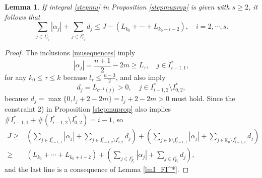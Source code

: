 \documentclass[11pt,reqno]{amsart}
\newtheorem{lemma}[theorem]{Lemma}
\numberwithin{equation}{section}
\theoremstyle{definition}
\begin{document}
\begin{lemma}\label{lmJlower}
	If integral \eqref{stepmu} in Proposition \ref{stepmuprop} is given with $s\geq2$, it follows that
	\begin{equation}\label{Jlowerbd2}
		\sum_{j\in I_{F_i}^1}|\alpha_j|+\sum_{j\in I_{F_i}^2}d_j\leq J-(L_{k_0}+\cdots+L_{k_0+i-2}),\quad i=2,\cdots,s.
	\end{equation}
\end{lemma}

\begin{proof}
	The inclusions \eqref{musequences} imply
	\begin{equation*}\label{alphaL}
		|\alpha_j|=\mbox{$\frac{n+1}{2}-2m$}\geq L_\tau,\quad j\in I_{i-1,1}^*,
	\end{equation*}
	for any $k_0\leq\tau\leq k$ because $l_\tau\leq\frac{n-3}{2}$, and also imply
	\begin{equation*}\label{d_j>0}
		d_j=L_{\sigma^{-1}(j)}>0,\quad j\in I_{i-1,2}^*\setminus I_{0,2}^*,
	\end{equation*}
	because $d_j=\max\{0,l_j+2-2m\}=l_j+2-2m>0$ must hold. Since the constraint 2) in Proposition \ref{stepmuprop} also implies $\#I_{i-1,1}^*+\#(I_{i-1,2}^*\setminus I_{0,2}^*)=i-1$, so
	\begin{equation*}
		\begin{split}
			J\geq&\left(\sum_{j\in I_{i-1,1}^*}|\alpha_j|+\sum_{j\in I_{i-1,2}^*\setminus I_{0,2}^*}d_j\right)+\left(\sum_{j\in\mathbb{K}\setminus I_{i-1,1}^*}|\alpha_j|+\sum_{j\in\mathbb{K}_0\setminus I_{i-1,2}^*}d_j\right)\\
			\geq&\left(L_{k_0}+\cdots+L_{k_0+i-2}\right)+\left(\sum_{j\in I_{F_i}^1}|\alpha_j|+\sum_{j\in I_{F_i}^2}d_j\right),
		\end{split}
	\end{equation*}
	and the last line is a consequence of Lemma \ref{lmI_FI^*}.
\end{proof}
\end{document}
